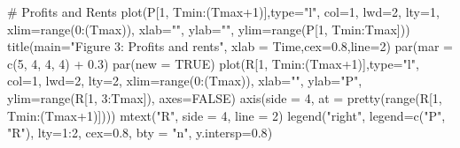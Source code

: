 \documentclass[
  letterpaper,
  DIV=11,
  numbers=noendperiod]{scrreprt}
\newenvironment{Shaded}{\begin{snugshade}}{\end{snugshade}}
\newcommand{\AttributeTok}[1]{\textcolor[rgb]{0.40,0.45,0.13}{#1}}
\newcommand{\CommentTok}[1]{\textcolor[rgb]{0.37,0.37,0.37}{#1}}
\newcommand{\ConstantTok}[1]{\textcolor[rgb]{0.56,0.35,0.01}{#1}}
\newcommand{\DecValTok}[1]{\textcolor[rgb]{0.68,0.00,0.00}{#1}}
\newcommand{\FloatTok}[1]{\textcolor[rgb]{0.68,0.00,0.00}{#1}}
\newcommand{\FunctionTok}[1]{\textcolor[rgb]{0.28,0.35,0.67}{#1}}
\newcommand{\NormalTok}[1]{\textcolor[rgb]{0.00,0.23,0.31}{#1}}
\newcommand{\SpecialCharTok}[1]{\textcolor[rgb]{0.37,0.37,0.37}{#1}}
\newcommand{\StringTok}[1]{\textcolor[rgb]{0.13,0.47,0.30}{#1}}
\begin{document}
\begin{Shaded}
\begin{Highlighting}[]
\CommentTok{\# Profits and Rents}
\FunctionTok{plot}\NormalTok{(P[}\DecValTok{1}\NormalTok{, Tmin}\SpecialCharTok{:}\NormalTok{(Tmax}\SpecialCharTok{+}\DecValTok{1}\NormalTok{)],}\AttributeTok{type=}\StringTok{"l"}\NormalTok{, }\AttributeTok{col=}\DecValTok{1}\NormalTok{, }\AttributeTok{lwd=}\DecValTok{2}\NormalTok{, }\AttributeTok{lty=}\DecValTok{1}\NormalTok{, }\AttributeTok{xlim=}\FunctionTok{range}\NormalTok{(}\DecValTok{0}\SpecialCharTok{:}\NormalTok{(Tmax)), }\AttributeTok{xlab=}\StringTok{""}\NormalTok{, }\AttributeTok{ylab=}\StringTok{""}\NormalTok{, }\AttributeTok{ylim=}\FunctionTok{range}\NormalTok{(P[}\DecValTok{1}\NormalTok{, Tmin}\SpecialCharTok{:}\NormalTok{Tmax])) }
\FunctionTok{title}\NormalTok{(}\AttributeTok{main=}\StringTok{"Figure 3: Profits and rents"}\NormalTok{, }\AttributeTok{xlab =} \StringTok{\textquotesingle{}Time\textquotesingle{}}\NormalTok{,}\AttributeTok{cex=}\FloatTok{0.8}\NormalTok{,}\AttributeTok{line=}\DecValTok{2}\NormalTok{)}
\FunctionTok{par}\NormalTok{(}\AttributeTok{mar =} \FunctionTok{c}\NormalTok{(}\DecValTok{5}\NormalTok{, }\DecValTok{4}\NormalTok{, }\DecValTok{4}\NormalTok{, }\DecValTok{4}\NormalTok{) }\SpecialCharTok{+} \FloatTok{0.3}\NormalTok{)}
\FunctionTok{par}\NormalTok{(}\AttributeTok{new =} \ConstantTok{TRUE}\NormalTok{)}
\FunctionTok{plot}\NormalTok{(R[}\DecValTok{1}\NormalTok{, Tmin}\SpecialCharTok{:}\NormalTok{(Tmax}\SpecialCharTok{+}\DecValTok{1}\NormalTok{)],}\AttributeTok{type=}\StringTok{"l"}\NormalTok{, }\AttributeTok{col=}\DecValTok{1}\NormalTok{, }\AttributeTok{lwd=}\DecValTok{2}\NormalTok{, }\AttributeTok{lty=}\DecValTok{2}\NormalTok{, }\AttributeTok{xlim=}\FunctionTok{range}\NormalTok{(}\DecValTok{0}\SpecialCharTok{:}\NormalTok{(Tmax)), }\AttributeTok{xlab=}\StringTok{""}\NormalTok{, }\AttributeTok{ylab=}\StringTok{"P"}\NormalTok{, }
     \AttributeTok{ylim=}\FunctionTok{range}\NormalTok{(R[}\DecValTok{1}\NormalTok{, }\DecValTok{3}\SpecialCharTok{:}\NormalTok{Tmax]), }\AttributeTok{axes=}\ConstantTok{FALSE}\NormalTok{) }
\FunctionTok{axis}\NormalTok{(}\AttributeTok{side =} \DecValTok{4}\NormalTok{, }\AttributeTok{at =} \FunctionTok{pretty}\NormalTok{(}\FunctionTok{range}\NormalTok{(R[}\DecValTok{1}\NormalTok{, Tmin}\SpecialCharTok{:}\NormalTok{(Tmax}\SpecialCharTok{+}\DecValTok{1}\NormalTok{)])))  }
\FunctionTok{mtext}\NormalTok{(}\StringTok{"R"}\NormalTok{, }\AttributeTok{side =} \DecValTok{4}\NormalTok{, }\AttributeTok{line =} \DecValTok{2}\NormalTok{)}
\FunctionTok{legend}\NormalTok{(}\StringTok{"right"}\NormalTok{, }\AttributeTok{legend=}\FunctionTok{c}\NormalTok{(}\StringTok{"P"}\NormalTok{, }\StringTok{"R"}\NormalTok{), }\AttributeTok{lty=}\DecValTok{1}\SpecialCharTok{:}\DecValTok{2}\NormalTok{, }\AttributeTok{cex=}\FloatTok{0.8}\NormalTok{, }\AttributeTok{bty =} \StringTok{"n"}\NormalTok{, }\AttributeTok{y.intersp=}\FloatTok{0.8}\NormalTok{)}
\end{Highlighting}
\end{Shaded}
\end{document}
